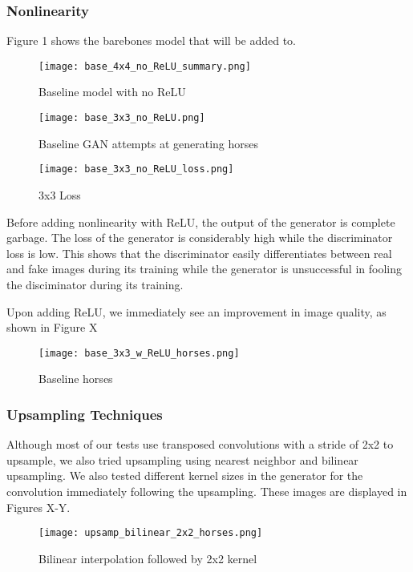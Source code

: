 \documentclass[sigplan,screen]{acmart}
\begin{document}
\subsubsection{Nonlinearity}

Figure 1 shows the barebones model that will be added to.

\begin{figure}
\texttt{[image: base\_4x4\_no\_ReLU\_summary.png]}
\caption{Baseline model with no ReLU}
\end{figure}

\begin{figure}
\texttt{[image: base\_3x3\_no\_ReLU.png]}
\caption{Baseline GAN attempts at generating horses}
\end{figure}

\begin{figure}
\texttt{[image: base\_3x3\_no\_ReLU\_loss.png]}
\caption{3x3 Loss}
\end{figure}

Before adding nonlinearity with ReLU, the output of the generator is complete garbage. The loss of the generator is considerably high while the discriminator loss is low. This shows that the discriminator easily differentiates between real and fake images during its training while the generator is unsuccessful in fooling the disciminator during its training.


Upon adding ReLU, we immediately see an improvement in image quality, as shown in Figure X

\begin{figure}
\texttt{[image: base\_3x3\_w\_ReLU\_horses.png]}
\caption{Baseline horses}
\end{figure}

\subsubsection{Upsampling Techniques}

Although most of our tests use transposed convolutions with a stride of 2x2 to upsample, we also tried upsampling using nearest neighbor and bilinear upsampling. We also tested different kernel sizes in the generator for the convolution immediately following the upsampling. These images are displayed in Figures X-Y.

\begin{figure}
\texttt{[image: upsamp\_bilinear\_2x2\_horses.png]}
\caption{Bilinear interpolation followed by 2x2 kernel}
\end{figure}
\end{document}
